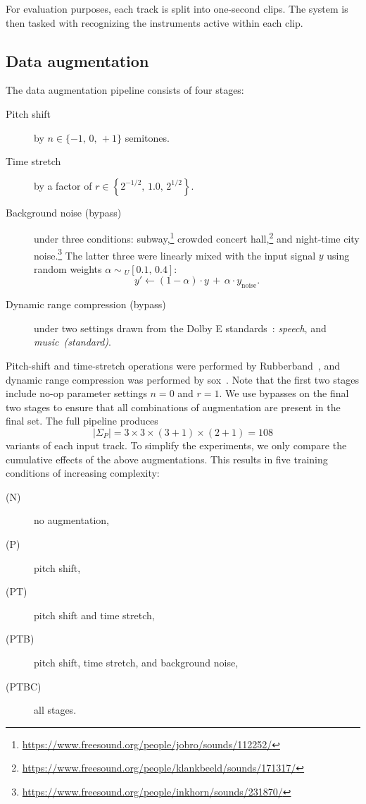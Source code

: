 \documentclass{article}
\begin{document}
For evaluation purposes, each track is split into one-second clips.
The system is then tasked with recognizing the instruments active within each clip.

\subsection{Data augmentation}

The data augmentation pipeline consists of four stages:

\begin{description}
    \item[Pitch shift] by $n \in \{-1,\, 0,\, +1\}$ semitones.
    \item[Time stretch] by a factor of $r \in \left\{ 2^{-1/2},\, 1.0,\, 2^{1/2}\right\}$.
    \item[Background noise (bypass)] under three conditions:
        subway,\footnote{\url{https://www.freesound.org/people/jobro/sounds/112252/}}
        crowded concert hall,\footnote{\url{https://www.freesound.org/people/klankbeeld/sounds/171317/}}
        and night-time city noise.\footnote{\url{https://www.freesound.org/people/inkhorn/sounds/231870/}}
        The latter three were linearly mixed with the input signal $y$ using random weights
        $\alpha \sim { }_U[0.1,\, 0.4]$:
        \[
            y' \leftarrow (1-\alpha) \cdot y \,+ \, \alpha \cdot y_\text{noise}.
        \]
    \item[Dynamic range compression (bypass)] under two settings drawn from the {Dolby E}
        standards~\cite{dolbyE}: \emph{speech},
        and \emph{music~(standard)}.
\end{description}

Pitch-shift and time-stretch operations were performed by Rubberband~\cite{rubberband}, and dynamic range
compression was performed by sox~\cite{sox}.
Note that the first two stages include no-op parameter settings $n=0$ and $r=1$.  We use
bypasses on the final two stages to ensure that all combinations of augmentation are
present in the final set.
The full pipeline produces
\[
|\Sigma_P| = 3\times 3\times (3+1)\times (2+1) = 108\]
variants of each input track.  To simplify the experiments, we only compare the cumulative effects of the above
augmentations.  This results in five training conditions of increasing complexity:
\begin{description}
    \item[(N)] no augmentation,
        \vspace{-.5\baselineskip}
    \item[(P)] pitch shift,
        \vspace{-.5\baselineskip}
    \item[(PT)] pitch shift and time stretch,
        \vspace{-.5\baselineskip}
    \item[(PTB)] pitch shift, time stretch, and background noise,
        \vspace{-.5\baselineskip}
    \item[(PTBC)] all stages.
\end{description}
\end{document}
